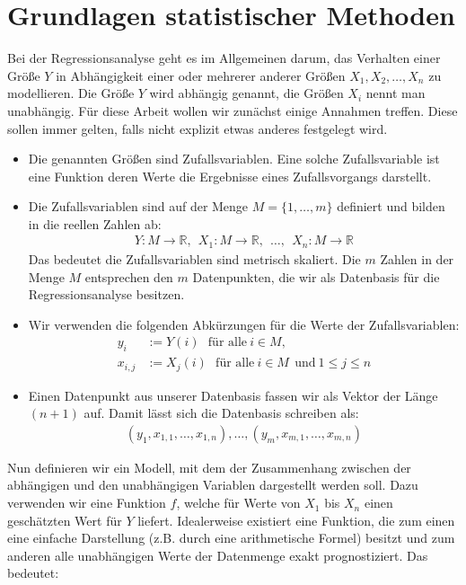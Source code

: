 \chapter{Grundlagen statistischer Methoden}
\label{chapter:2}

Bei der Regressionsanalyse geht es im Allgemeinen darum, das Verhalten einer Größe $Y$ in Abhängigkeit einer oder mehrerer anderer Größen $X_1, X_2, \dots, X_n$ zu modellieren. Die Größe $Y$ wird abhängig genannt, die Größen $X_i$ nennt man unabhängig. Für diese Arbeit wollen wir zunächst einige Annahmen treffen. Diese sollen immer gelten, falls nicht explizit etwas anderes festgelegt wird.
\begin{itemize}
    \item Die genannten Größen sind Zufallsvariablen. Eine solche Zufallsvariable ist eine Funktion deren Werte die Ergebnisse eines Zufallsvorgangs darstellt.
    \item Die Zufallsvariablen sind auf der Menge $M = \{1, \dots, m\}$ definiert und bilden in die reellen Zahlen ab:
    \begin{align*}
        Y: M \rightarrow \mathbb{R},~~ X_1: M \rightarrow \mathbb{R},~~ \dots,~~ X_n: M \rightarrow \mathbb{R}
    \end{align*}
    Das bedeutet die Zufallsvariablen sind metrisch skaliert. Die $m$ Zahlen in der Menge $M$ entsprechen den $m$ Datenpunkten, die wir als Datenbasis für die Regressionsanalyse besitzen.
    \item Wir verwenden die folgenden Abkürzungen für die Werte der Zufallsvariablen:
    \begin{align*}
        y_i &:= Y(i) ~~~\text{für alle}~ i \in M,\\
        x_{i, j} &:= X_j(i) ~~~\text{für alle}~ i \in M ~~\text{und}~ 1 \leq j \leq n
    \end{align*}
    \item Einen Datenpunkt aus unserer Datenbasis fassen wir als Vektor der Länge $(n + 1)$ auf. Damit lässt sich die Datenbasis schreiben als:
    \begin{align*}
        (y_1, x_{1,1}, \dots, x_{1,n}), \dots, (y_m, x_{m,1}, \dots, x_{m,n})
    \end{align*}
\end{itemize}
Nun definieren wir ein Modell, mit dem der Zusammenhang zwischen der abhängigen und den unabhängigen Variablen dargestellt werden soll. Dazu verwenden wir eine Funktion $f$, welche für Werte von  $X_1$ bis $X_n$ einen geschätzten Wert für $Y$ liefert. Idealerweise existiert eine Funktion, die zum einen eine einfache Darstellung (z.B. durch eine arithmetische Formel) besitzt und zum anderen alle unabhängigen Werte der Datenmenge exakt prognostiziert. Das bedeutet:
